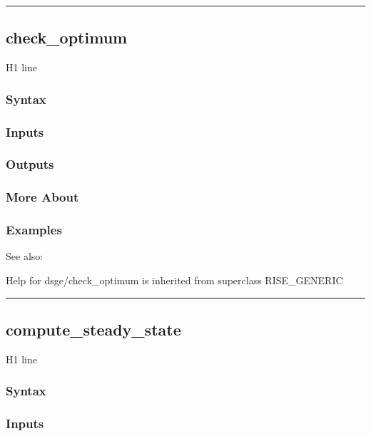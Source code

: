 \documentclass[letterpaper,10pt,english]{sphinxmanual}
\begin{document}
\bigskip\hrule{}\bigskip



\subsection{check\_optimum}
\label{classes/models/@dsge/dsge:check-optimum}\label{classes/models/@dsge/dsge:id1}
H1 line


\subsubsection{Syntax}
\label{classes/models/@dsge/dsge:id2}

\subsubsection{Inputs}
\label{classes/models/@dsge/dsge:id3}

\subsubsection{Outputs}
\label{classes/models/@dsge/dsge:id4}

\subsubsection{More About}
\label{classes/models/@dsge/dsge:id5}

\subsubsection{Examples}
\label{classes/models/@dsge/dsge:id6}
See also:

Help for dsge/check\_optimum is inherited from superclass RISE\_GENERIC


\bigskip\hrule{}\bigskip



\subsection{compute\_steady\_state}
\label{classes/models/@dsge/dsge:id7}\label{classes/models/@dsge/dsge:compute-steady-state}
H1 line


\subsubsection{Syntax}
\label{classes/models/@dsge/dsge:id8}

\subsubsection{Inputs}
\label{classes/models/@dsge/dsge:id9}
\end{document}
